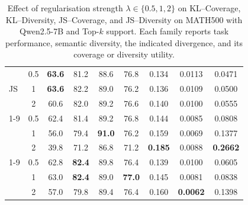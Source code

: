 \documentclass{article} %
\begin{document}
\begin{table}[!htbp]
{\begin{tabular}{lc|ccccc|cc}
\multirow{3}{*}{JS}
& 0.5 & \textbf{63.6} & 81.2 & 88.6 & 76.8 & 0.134
& 0.0113 & 0.0471 \\
& 1 & \textbf{63.6} & 82.2 & 89.0 & 76.2 & 0.136
& 0.0109 & 0.0500 \\
& 2 & 60.6 & 82.0 & 89.2 & 76.6 & 0.140
& 0.0100 & 0.0555 \\

\cmidrule(lr){1-9}

\multirow{3}{*}{Diversity}
& 0.5 & 62.4 & 81.4 & 89.2 & 76.8 & 0.144
& 0.0085 & 0.0808 \\
& 1 & 56.0 & 79.4 & \textbf{91.0} & 76.2 & 0.159
& 0.0069 & 0.1377 \\
& 2 & 39.8 & 71.2 & 86.8 & 71.2 & \textbf{0.185}
& 0.0088 & \textbf{0.2662} \\

\cmidrule(lr){1-9}

\multirow{3}{*}{JS + Diversity}
& 0.5 & 62.8 & \textbf{82.4} & 89.8 & 76.4 & 0.139
& 0.0100 & 0.0605 \\
& 1 & 63.0 & \textbf{82.4} & 89.0 & \textbf{77.0} & 0.145
& 0.0081 & 0.0838 \\
& 2 & 57.0 & 79.8 & 89.4 & 76.4 & 0.160
& \textbf{0.0062} & 0.1398 \\
\bottomrule
\end{tabular}%
}
\caption{Effect of regularisation strength
$\lambda\in\{0.5,1,2\}$ on KL--Coverage, KL--Diversity,
JS--Coverage, and JS--Diversity on MATH500 with Qwen2.5-7B
and Top-$k$ support. Each family reports task performance,
semantic diversity, the indicated divergence, and its
coverage or diversity utility.}
\label{tab:regulariser-family-sweeps}
\end{table}
\end{document}

